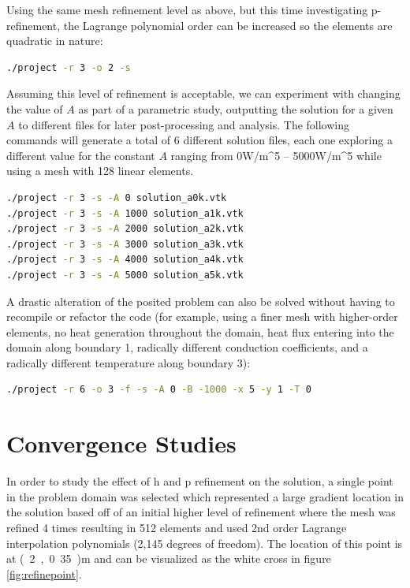 \documentclass[letterpaper,10pt]{article}
\begin{document}
Using the same mesh refinement level as above, but this time investigating p-refinement, the Lagrange polynomial order can be increased so the elements are quadratic in nature:
\vspace{-6mm}
\begin{lstlisting}[numbers=none,frame=none,language=bash]
./project -r 3 -o 2 -s
\end{lstlisting}
\vspace{1mm}

Assuming this level of refinement is acceptable, we can experiment with changing the value of $A$ as part of a parametric study, outputting the solution for a given $A$ to different files for later post-processing and analysis. The following commands will generate a total of 6 different solution files, each one exploring a different value for the constant $A$ ranging from \unit{0}{W/m^5} -- \unit{5000}{W/m^5} while using a mesh with 128 linear elements.
\vspace{-6mm}
\begin{lstlisting}[numbers=none,frame=none,language=bash]
./project -r 3 -s -A 0 solution_a0k.vtk
./project -r 3 -s -A 1000 solution_a1k.vtk
./project -r 3 -s -A 2000 solution_a2k.vtk
./project -r 3 -s -A 3000 solution_a3k.vtk
./project -r 3 -s -A 4000 solution_a4k.vtk
./project -r 3 -s -A 5000 solution_a5k.vtk
\end{lstlisting}
\vspace{1mm}

A drastic alteration of the posited problem can also be solved without having to recompile or refactor the code (for example, using a finer mesh with higher-order elements, no heat generation throughout the domain, heat flux entering into the domain along boundary 1, radically different conduction coefficients, and a radically different temperature along boundary 3):
\vspace{-6mm}
\begin{lstlisting}[numbers=none,frame=none,language=bash]
./project -r 6 -o 3 -f -s -A 0 -B -1000 -x 5 -y 1 -T 0
\end{lstlisting}
\vspace{1mm}

\section{Convergence Studies}
In order to study the effect of h and p refinement on the solution, a single point in the problem domain was selected which represented a large gradient location in the solution based off of an initial higher level of refinement where the mesh was refined 4 times resulting in 512 elements and used 2nd order Lagrange interpolation polynomials (2,145 degrees of freedom). The location of this point is at \unit{(2,0.35)}{m} and can be visualized as the white cross in figure \ref{fig:refinepoint}.
\end{document}
